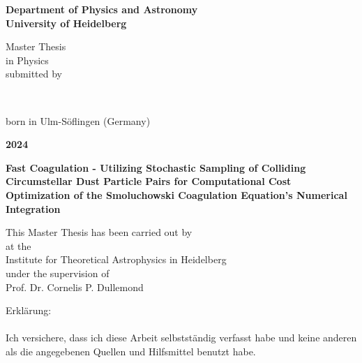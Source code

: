 \newpage

\begin{titlepage}
    \begin{center}
        \begin{Large}
            \textbf{
              Department of Physics and Astronomy \\
              University of Heidelberg
            }
        \end{Large}

        \vfill
        
        Master Thesis \\
        in Physics \\
        submitted by \\
        \vspace{0.5cm}

        \begin{Large}
            \textbf{\theauthor} \\
        \end{Large}
        \vspace{0.5cm}

        born in Ulm-Söflingen (Germany) \\
        \vspace{0.5cm}

        \begin{Large}
            \textbf{2024}
        \end{Large}
    \end{center}
\end{titlepage}

\newpage

\begin{titlepage}
    \begin{center}
        \begin{Large}
            \textbf{
                Fast Coagulation - Utilizing Stochastic Sampling of Colliding Circumstellar Dust 
                Particle Pairs for Computational Cost Optimization of the Smoluchowski Coagulation 
                Equation's Numerical Integration
            }
        \end{Large}
        
        \vfill
        
        This Master Thesis has been carried out by \theauthor \\
        at the \\
        Institute for Theoretical Astrophysics in Heidelberg \\
        under the supervision of \\
        Prof. Dr. Cornelis P. Dullemond
    \end{center}
\end{titlepage}

\newpage

\begin{titlepage}
    Erklärung: \\
    \\
    Ich versichere, dass ich diese Arbeit selbstständig verfasst habe und keine anderen als die 
    angegebenen Quellen und Hilfsmittel benutzt habe.
\end{titlepage}

\begin{titlepage}
    \ 
\end{titlepage}
